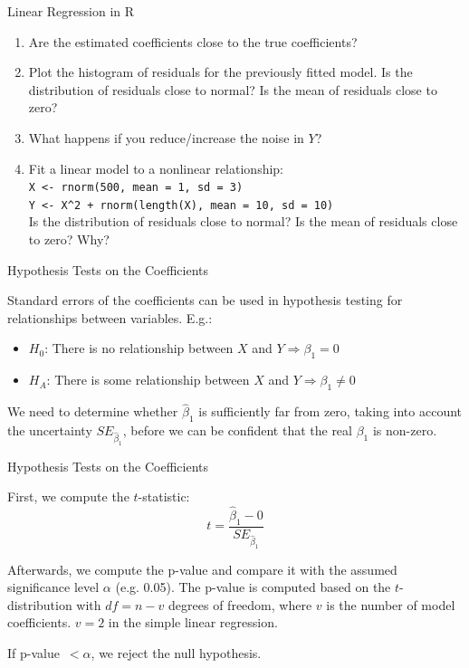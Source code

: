 \begin{frame}{Linear Regression in R}

    \begin{example}
        \medskip
        \begin{enumerate}
            \item Are the estimated coefficients close to the true coefficients?
            \item Plot the histogram of residuals for the previously fitted model. Is the distribution of residuals close to normal? Is the mean of residuals close to zero?
            \item What happens if you reduce/increase the noise in $Y$?
            \item Fit a linear model to a nonlinear relationship:\\
            {\small\texttt{X <- rnorm(500, mean = 1, sd = 3)}}\\
            {\small\texttt{Y <- X\^{}2 + rnorm(length(X), mean = 10, sd = 10)}}\\
            Is the distribution of residuals close to normal? Is the mean of residuals close to zero? Why?
        \end{enumerate}
    \end{example}

\end{frame}

\begin{frame}{Hypothesis Tests on the Coefficients}

    Standard errors of the coefficients can be used in hypothesis testing for relationships between variables. E.g.:
    \begin{itemize}
        \item $H_0$: There is no relationship between $X$ and $Y \Rightarrow \beta_1 = 0$
        \item $H_A$: There is some relationship between $X$ and $Y \Rightarrow \beta_1 \ne 0$
    \end{itemize}

    We need to determine whether $\hat{\beta}_1$ is sufficiently far from zero, taking into account the uncertainty $SE_{\hat{\beta}_1}$, before we can be confident that the real $\beta_1$ is non-zero.

\end{frame}

\begin{frame}{Hypothesis Tests on the Coefficients}

    First, we compute the $t$-statistic:
    \begin{equation*}
    t = \frac{\hat{\beta}_1 - 0}{SE_{\hat{\beta}_1}}
    \end{equation*}

    Afterwards, we compute the p-value and compare it with the assumed significance level $\alpha$ (e.g. 0.05). The p-value is computed based on the $t$-distribution with $df = n - v$ degrees of freedom, where $v$ is the number of model coefficients. $v = 2$ in the simple linear regression.
    
    If p-value~$< \alpha$, we reject the null hypothesis.
    
\end{frame}   
 
